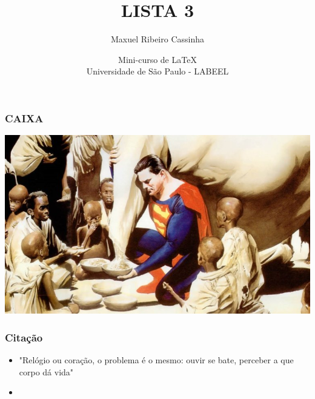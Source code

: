 \documentclass{beamer}
\title[LISTA 3]{\Huge{\textcolor{blue!70!black}{LISTA 3}}}
\author[Cassinha]{\textcolor{blue!70!black}{\huge{Maxuel Ribeiro Cassinha}}\\
\text{\scriptsize{\textcolor{blue!70!black}{maxuel.cassinha@usp.com.br}}}}
\date[EEL-USP]{\scriptsize{\textcolor{blue!70!black}{Mini-curso de \LaTeX}} \\ \textcolor{blue!70!black}{Universidade de São Paulo - LABEEL}}
\begin{document}

  \begin{frame}
    \titlepage
  \end{frame}


\begin{frame}
  \frametitle{CAIXA}

\begin{tcolorbox}[colback=blue!70!white,colframe=blue!70!white,title=PAZ NA TERRA]
\includegraphics[width=0.8\paperwidth,height=0.7\paperheight]{Imagens/Paznaterra.jpg}

\end{tcolorbox}

\end{frame}

\begin{frame}
  \frametitle{Citação}
\begin{itemize}
    \item { \textcolor{blue!70!black}{"Relógio ou coração, o problema é o mesmo: ouvir se bate, perceber a que corpo dá vida"}}
    \item{ \textcolor{blue!70!black}{\cite{pessoa2015melhores}}}
\end{itemize}

\end{frame}

\textcolor{blue!70!black}{}
\end{document}

